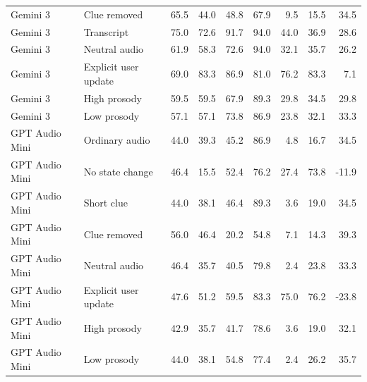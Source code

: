 \begin{table}[htbp]
\begin{tabular}{@{}ll rrr rrr r@{}}
    Gemini 3 & Clue removed & 65.5 & 44.0 & 48.8 & 67.9 & 9.5 & 15.5 & 34.5 \\
    Gemini 3 & Transcript & 75.0 & 72.6 & 91.7 & 94.0 & 44.0 & 36.9 & 28.6 \\
    Gemini 3 & Neutral audio & 61.9 & 58.3 & 72.6 & 94.0 & 32.1 & 35.7 & 26.2 \\
    Gemini 3 & Explicit user update & 69.0 & 83.3 & 86.9 & 81.0 & 76.2 & 83.3 & 7.1 \\
    Gemini 3 & High prosody & 59.5 & 59.5 & 67.9 & 89.3 & 29.8 & 34.5 & 29.8 \\
    Gemini 3 & Low prosody & 57.1 & 57.1 & 73.8 & 86.9 & 23.8 & 32.1 & 33.3 \\
    \addlinespace
    GPT Audio Mini & Ordinary audio & 44.0 & 39.3 & 45.2 & 86.9 & 4.8 & 16.7 & 34.5 \\
    GPT Audio Mini & No state change & 46.4 & 15.5 & 52.4 & 76.2 & 27.4 & 73.8 & -11.9 \\
    GPT Audio Mini & Short clue & 44.0 & 38.1 & 46.4 & 89.3 & 3.6 & 19.0 & 34.5 \\
    GPT Audio Mini & Clue removed & 56.0 & 46.4 & 20.2 & 54.8 & 7.1 & 14.3 & 39.3 \\
    GPT Audio Mini & Neutral audio & 46.4 & 35.7 & 40.5 & 79.8 & 2.4 & 23.8 & 33.3 \\
    GPT Audio Mini & Explicit user update & 47.6 & 51.2 & 59.5 & 83.3 & 75.0 & 76.2 & -23.8 \\
    GPT Audio Mini & High prosody & 42.9 & 35.7 & 41.7 & 78.6 & 3.6 & 19.0 & 32.1 \\
    GPT Audio Mini & Low prosody & 44.0 & 38.1 & 54.8 & 77.4 & 2.4 & 26.2 & 35.7 \\
    \bottomrule
  \end{tabular}
\end{table}
